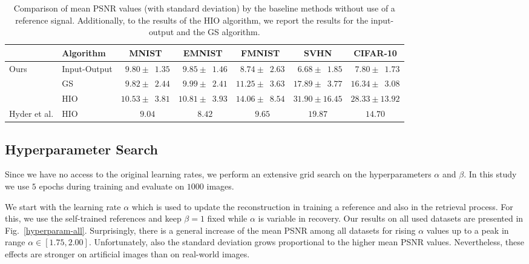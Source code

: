 \begin{table}
	\centering\small
	\begin{tabular}{llccccc}
		\toprule
		& Algorithm & MNIST& EMNIST& FMNIST & SVHN & CIFAR-10 \\
		\midrule

		\multirow{3}{*}{Ours} & Input-Output & $ \phantom{0}9.80\pm \phantom{0}1.35$ & $ \phantom{0}9.85\pm \phantom{0}1.46$ & $\phantom{0}8.74 \pm  \phantom{0}2.63$ & $\phantom{0}6.68 \pm \phantom{0}1.85$ & $\phantom{0}7.80 \pm \phantom{0}1.73$ \\

		& GS & $\phantom{0}9.82\pm \phantom{0}2.44$ & $ \phantom{0}9.99\pm \phantom{0}2.41$ & $11.25 \pm  \phantom{0}3.63$ & $17.89 \pm \phantom{0}3.77$ & $ 16.34\pm \phantom{0}3.08$ \\

		& HIO  & $10.53\pm \phantom{0}3.81 $& $10.81\pm \phantom{0}3.93$ & $14.06 \pm \phantom{0}8.54$ &  $31.90 \pm 16.45$ & $28.33 \pm 13.92$ \\
		\midrule
		\multirow{1}{*}{Hyder et al. \cite{hyder2020solving}} & HIO & $\phantom{0}9.04$ & $\phantom{0}8.42 $ & $\phantom{0}9.65$ & $19.87$ & $14.70$ \\


		\bottomrule
	\end{tabular}
	\caption{Comparison of mean PSNR values (with standard deviation) by the baseline methods without use of a reference signal. Additionally, to the results of the HIO algorithm, we report the results for the input-output and the GS algorithm.}
	\label{results:baseline}
\end{table}

\subsection{Hyperparameter Search}
\label{sec:hyperp-search}
Since we have no access to the original learning rates, we perform an extensive
grid search on the hyperparameters $\alpha$ and $\beta$. In this study we use $5$ epochs during training and evaluate on $1000$ images.

We start with the learning rate $\alpha$ which is used to update the
reconstruction in training a reference and also in the retrieval
process. For this, we use the self-trained references and keep $\beta = 1$
fixed while $\alpha$ is variable in recovery. Our results on all used datasets are presented in
Fig.~\ref{hyperparam-all}.
Surprisingly, there is a general increase
of the mean PSNR among all datasets for rising $\alpha$ values up to a
peak in range $\alpha \in [1.75, 2.00]$. %
Unfortunately, also the standard deviation grows proportional to the higher mean PSNR
values. Nevertheless, these effects are stronger on artificial images
than on real-world images.

